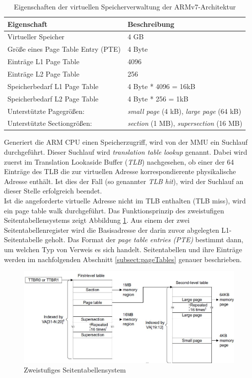 \begin{table}[H]
\begin{tabular}{p{7cm} | p{7cm}}
  \textbf{Eigenschaft} & \textbf{Beschreibung} \\ \hline
  Virtueller Speicher & 4 GB\\  
  Größe eines Page Table Entry (PTE) & 4 Byte \\
  Einträge L1 Page Table & 4096\\
  Einträge L2 Page Table & 256\\
  Speicherbedarf L1 Page Table & 4 Byte * 4096 = 16kB \\
  Speicherbedarf L2 Page Table & 4 Byte * 256 = 1kB\\
  Unterstützte Pagegrößen: & \emph{small page} (4 kB), \emph{large page} (64 kB)\\
  Unterstützte Sectiongrößen: & \emph{section} (1 MB), \emph{supersection} (16 MB)\\
 \end{tabular}
 \caption{Eigenschaften der virtuellen Speicherverwaltung der ARMv7-Architektur}
 \label{table:GeneralVirtualMemory}
\end{table}

Generiert die ARM CPU einen Speicherzugriff, wird von der MMU ein Suchlauf durchgeführt. Dieser Suchlauf wird \emph{translation table lookup} genannt. Dabei wird zuerst im Translation Lookaside Buffer (\emph{TLB}) nachgesehen, ob einer der 64 Einträge des TLB die zur virtuellen Adresse korrespondierente physikalische Adresse enthält. Ist dies der Fall (so genannter \emph{TLB hit}), wird der Suchlauf an dieser Stelle erfolgreich beendet.\\

Ist die angeforderte virtuelle Adresse nicht im TLB enthalten (TLB miss), wird ein page table walk durchgeführt. Das Funktionsprinzip des zweistufigen Seitentabellensystems zeigt Abbildung \ref{fig:2levelTableSystem}. Aus einem der zwei Seitentabellenregister wird die Basisadresse der darin zuvor abgelegten L1-Seitentabelle geholt. Das Format der \emph{page table entries (PTE)} bestimmt dann, um welchen Typ von Verweis es sich handelt. Seitentabellen und ihre Einträge werden im nachfolgenden Abschnitt \ref{subsect:pageTables} genauer beschrieben.\\

\begin{figure}[H]
	\includegraphics[scale=0.7]{figures/addressTranslation}
	\caption{Zweistufiges Seitentabellensystem \cite[S. B3-1325]{ARM:ARM}}
	\label{fig:2levelTableSystem}
\end{figure}

